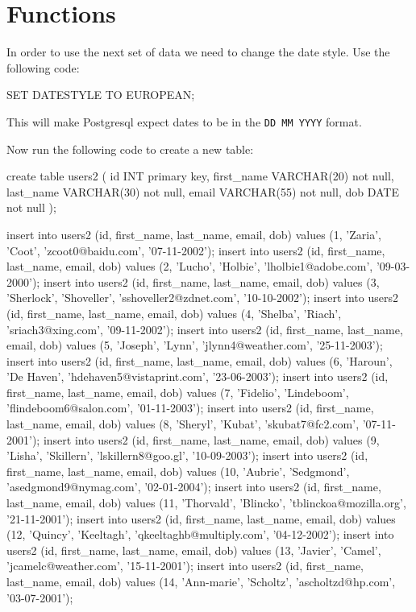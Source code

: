 \section*{Functions}
In order to use the next set of data we need to change the date style. Use the following code:
\begin{sql}
SET DATESTYLE TO EUROPEAN;
\end{sql}
This will make Postgresql expect dates to be in the \verb|DD MM YYYY| format.

Now run the following code to create a new table:
\begin{sql}
create table users2 (
	id INT primary key,
	first_name VARCHAR(20) not null,
	last_name VARCHAR(30) not null,
	email VARCHAR(55) not null,
	dob DATE not null
);

insert into users2 (id, first_name, last_name, email, dob) values (1, 'Zaria', 'Coot', 'zcoot0@baidu.com', '07-11-2002');
insert into users2 (id, first_name, last_name, email, dob) values (2, 'Lucho', 'Holbie', 'lholbie1@adobe.com', '09-03-2000');
insert into users2 (id, first_name, last_name, email, dob) values (3, 'Sherlock', 'Shoveller', 'sshoveller2@zdnet.com', '10-10-2002');
insert into users2 (id, first_name, last_name, email, dob) values (4, 'Shelba', 'Riach', 'sriach3@xing.com', '09-11-2002');
insert into users2 (id, first_name, last_name, email, dob) values (5, 'Joseph', 'Lynn', 'jlynn4@weather.com', '25-11-2003');
insert into users2 (id, first_name, last_name, email, dob) values (6, 'Haroun', 'De Haven', 'hdehaven5@vistaprint.com', '23-06-2003');
insert into users2 (id, first_name, last_name, email, dob) values (7, 'Fidelio', 'Lindeboom', 'flindeboom6@salon.com', '01-11-2003');
insert into users2 (id, first_name, last_name, email, dob) values (8, 'Sheryl', 'Kubat', 'skubat7@fc2.com', '07-11-2001');
insert into users2 (id, first_name, last_name, email, dob) values (9, 'Lisha', 'Skillern', 'lskillern8@goo.gl', '10-09-2003');
insert into users2 (id, first_name, last_name, email, dob) values (10, 'Aubrie', 'Sedgmond', 'asedgmond9@nymag.com', '02-01-2004');
insert into users2 (id, first_name, last_name, email, dob) values (11, 'Thorvald', 'Blincko', 'tblinckoa@mozilla.org', '21-11-2001');
insert into users2 (id, first_name, last_name, email, dob) values (12, 'Quincy', 'Keeltagh', 'qkeeltaghb@multiply.com', '04-12-2002');
insert into users2 (id, first_name, last_name, email, dob) values (13, 'Javier', 'Camel', 'jcamelc@weather.com', '15-11-2001');
insert into users2 (id, first_name, last_name, email, dob) values (14, 'Ann-marie', 'Scholtz', 'ascholtzd@hp.com', '03-07-2001');

\end{sql}
